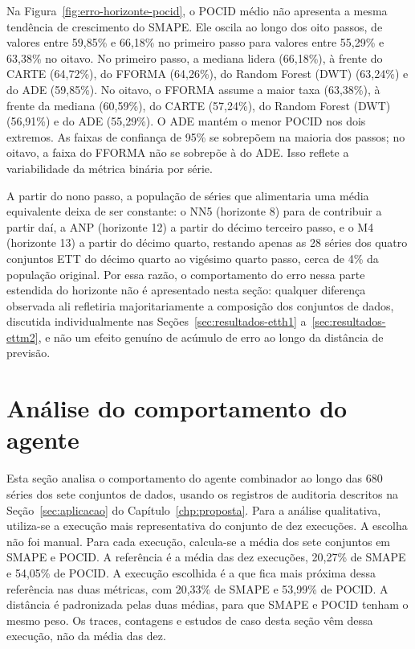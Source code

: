 Na Figura~\ref{fig:erro-horizonte-pocid}, o POCID médio não apresenta a mesma tendência de crescimento do SMAPE. Ele oscila ao longo dos oito passos, de valores entre 59,85\% e 66,18\% no primeiro passo para valores entre 55,29\% e 63,38\% no oitavo. No primeiro passo, a mediana lidera (66,18\%), à frente do CARTE (64,72\%), do FFORMA (64,26\%), do Random Forest (DWT) (63,24\%) e do ADE (59,85\%). No oitavo, o FFORMA assume a maior taxa (63,38\%), à frente da mediana (60,59\%), do CARTE (57,24\%), do Random Forest (DWT) (56,91\%) e do ADE (55,29\%). O ADE mantém o menor POCID nos dois extremos. As faixas de confiança de 95\% se sobrepõem na maioria dos passos; no oitavo, a faixa do FFORMA não se sobrepõe à do ADE. Isso reflete a variabilidade da métrica binária por série.

A partir do nono passo, a população de séries que alimentaria uma média equivalente deixa de ser constante: o NN5 (horizonte 8) para de contribuir a partir daí, a ANP (horizonte 12) a partir do décimo terceiro passo, e o M4 (horizonte 13) a partir do décimo quarto, restando apenas as 28 séries dos quatro conjuntos ETT do décimo quarto ao vigésimo quarto passo, cerca de 4\% da população original. Por essa razão, o comportamento do erro nessa parte estendida do horizonte não é apresentado nesta seção: qualquer diferença observada ali refletiria majoritariamente a composição dos conjuntos de dados, discutida individualmente nas Seções~\ref{sec:resultados-etth1} a~\ref{sec:resultados-ettm2}, e não um efeito genuíno de acúmulo de erro ao longo da distância de previsão.
\section{Análise do comportamento do agente} \label{sec:resultados-agente}

Esta seção analisa o comportamento do agente combinador ao longo das 680 séries dos sete conjuntos de dados, usando os registros de auditoria descritos na Seção~\ref{sec:aplicacao} do Capítulo~\ref{chp:proposta}. Para a análise qualitativa, utiliza-se a execução mais representativa do conjunto de dez execuções. A escolha não foi manual. Para cada execução, calcula-se a média dos sete conjuntos em SMAPE e POCID. A referência é a média das dez execuções, 20,27\% de SMAPE e 54,05\% de POCID. A execução escolhida é a que fica mais próxima dessa referência nas duas métricas, com 20,33\% de SMAPE e 53,99\% de POCID. A distância é padronizada pelas duas médias, para que SMAPE e POCID tenham o mesmo peso. Os traces, contagens e estudos de caso desta seção vêm dessa execução, não da média das dez.

